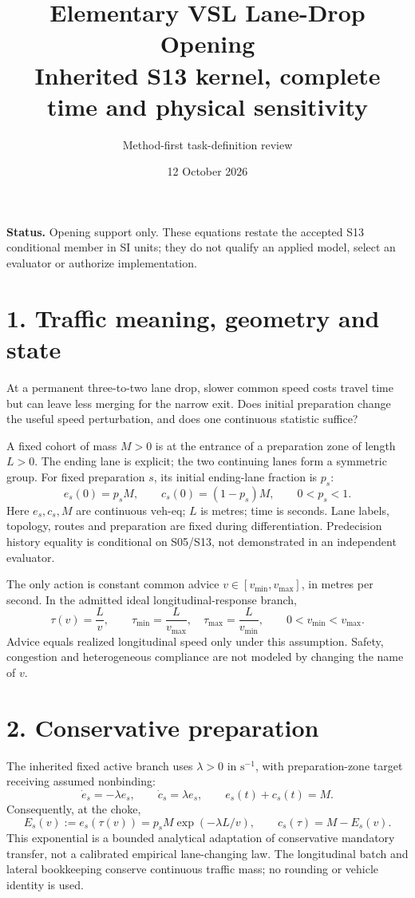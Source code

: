 \documentclass[11pt]{article}
\title{Elementary VSL Lane-Drop Opening\\[0.3em]
\large Inherited S13 kernel, complete time and physical sensitivity}
\author{Method-first task-definition review}
\date{12 October 2026}
\newcommand{\ve}{\mathrm{veh\mbox{-}eq}}
\begin{document}
\maketitle
\vspace{-1em}

\textbf{Status.} Opening support only. These equations restate the accepted
S13 conditional member in SI units; they do not qualify an applied model,
select an evaluator or authorize implementation.

\section*{1. Traffic meaning, geometry and state}
At a permanent three-to-two lane drop, slower common speed costs travel time
but can leave less merging for the narrow exit. Does initial preparation change
the useful speed perturbation, and does one continuous statistic suffice?

A fixed cohort of mass $M>0$ is at the entrance of a preparation zone of length
$L>0$. The ending lane is explicit; the two continuing lanes form a symmetric
group. For fixed preparation $s$, its initial ending-lane fraction is $p_s$:
\begin{equation}
 e_s(0)=p_s M,\qquad c_s(0)=(1-p_s)M,\qquad 0<p_s<1.
 \label{eq:initial}
\end{equation}
Here $e_s,c_s,M$ are continuous $\ve$; $L$ is metres; time is seconds.
Lane labels, topology, routes and preparation are fixed during differentiation.
Predecision history equality is conditional on S05/S13, not demonstrated in an
independent evaluator.

The only action is constant common advice $v\in[v_{\min},v_{\max}]$, in
metres per second. In the admitted ideal longitudinal-response branch,
\begin{equation}
 \tau(v)=\frac{L}{v},\qquad
 \tau_{\min}=\frac{L}{v_{\max}},\quad
 \tau_{\max}=\frac{L}{v_{\min}},\qquad 0<v_{\min}<v_{\max}.
 \label{eq:traversal}
\end{equation}
Advice equals realized longitudinal speed only under this assumption. Safety,
congestion and heterogeneous compliance are not modeled by changing the name
of $v$.

\section*{2. Conservative preparation}
The inherited fixed active branch uses $\lambda>0$ in $\mathrm{s}^{-1}$,
with preparation-zone target receiving assumed nonbinding:
\begin{equation}
 \dot e_s=-\lambda e_s,\qquad \dot c_s=\lambda e_s,
 \qquad e_s(t)+c_s(t)=M.
 \label{eq:transfer}
\end{equation}
Consequently, at the choke,
\begin{equation}
 E_s(v):=e_s(\tau(v))=p_sM\exp(-\lambda L/v),\qquad
 c_s(\tau)=M-E_s(v).
 \label{eq:remaining}
\end{equation}
This exponential is a bounded analytical adaptation of conservative mandatory
transfer, not a calibrated empirical lane-changing law. The longitudinal batch
and lateral bookkeeping conserve continuous traffic mass; no rounding or
vehicle identity is used.
\end{document}
